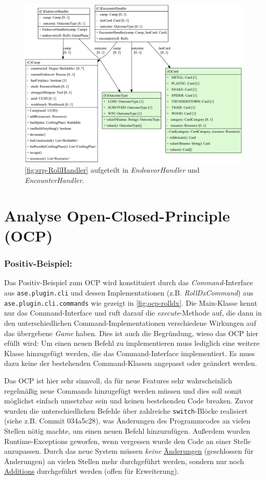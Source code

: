 \begin{figure}[H]
	\centering
	\includegraphics[width=1.\textwidth]{Bilder/RollHandler_fixed_structure.pdf} 
	\caption{\autoref{fig:srp-RollHandler} aufgeteilt in \textit{EndeavorHandler} und \textit{EncounterHandler}.}
	\label{fig:srp-RollHandler-fixed}
\end{figure} 


\section{Analyse Open-Closed-Principle (OCP)}

\subsubsection{Positiv-Beispiel:}

Das Positiv-Beispiel zum OCP wird konstituiert durch das \textit{Command}-Interface aus \texttt{ase.plugin.cli} 
und dessen Implementationen (z.B. \textit{RollDxCommand}) aus \texttt{ase.plugin.cli.commands} wie gezeigt in \autoref{fig:ocp-rolldx}. 
Die Main-Klasse kennt nur das Command-Interface und ruft darauf die \textit{execute}-Methode auf, 
die dann in den unterschiedlichen Command-Implementationen verschiedene Wirkungen auf das übergebene 
\textit{Game} haben. Dies ist auch die Begründung, wieso das OCP hier efüllt wird: Um einen neuen Befehl 
zu implementieren muss lediglich eine weitere Klasse hinzugefügt werden, die das Command-Interface implementiert.
Es muss dazu keine der bestehenden Command-Klassen angepasst oder geändert werden. 

Das OCP ist hier sehr sinnvoll, da für neue Features sehr wahrscheinlich regelmäßig neue Commands hinzugefügt 
werden müssen und dies soll somit möglichst einfach umsetzbar sein und keinen bestehenden Code breaken. 
Zuvor wurden die unterschiedlichen Befehle über zahlreiche \texttt{switch}-Blöcke realisiert 
(siehe z.B. Commit 034a5c28), was Änderungen des Programmcodes an vielen Stellen nötig machte, 
um einen neuen Befehl hinzuzufügen. Außerdem wurden Runtime-Exceptions geworfen, wenn vergessen wurde 
den Code an einer Stelle anzupassen. Durch das neue System müssen \textit{keine} \underline{Änderungen} 
(geschlossen für Änderungen) an vielen Stellen mehr durchgeführt werden, 
sondern nur noch \underline{Additions} durchgeführt werden (offen für Erweiterung).  

